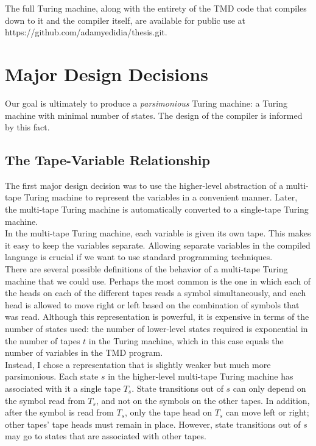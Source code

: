 \documentclass[11pt]{report}
\begin{document}
The full Turing machine, along with the entirety of the TMD code that compiles down to it and the compiler itself, are available for public use at https://github.com/adamyedidia/thesis.git.

\section{Major Design Decisions}

Our goal is ultimately to produce a \emph{parsimonious} Turing machine: a Turing machine with minimal number of states. The design of the compiler is informed by this fact. \\

\subsection{The Tape-Variable Relationship}

The first major design decision was to use the higher-level abstraction of a multi-tape Turing machine to represent the variables in a convenient manner. Later, the multi-tape Turing machine is automatically converted to a single-tape Turing machine.  \\

In the multi-tape Turing machine, each variable is given its own tape. This makes it easy to keep the variables separate. Allowing separate variables in the compiled language is crucial if we want to use standard programming techniques. \\

There are several possible definitions of the behavior of a multi-tape Turing machine that we could use. Perhaps the most common is the one in which each of the heads on each of the different tapes reads a symbol simultaneously, and each head is allowed to move right or left based on the combination of symbols that was read. Although this representation is powerful, it is expensive in terms of the number of states used: the number of lower-level states required is exponential in the number of tapes $t$ in the Turing machine, which in this case equals the number of variables in the TMD program. \\

Instead, I chose a representation that is slightly weaker but much more parsimonious. Each state $s$ in the higher-level multi-tape Turing machine has associated with it a single tape $T_s$. State transitions out of $s$ can only depend on the symbol read from $T_s$, and not on the symbols on the other tapes. In addition, after the symbol is read from $T_s$, only the tape head on $T_s$ can move left or right; other tapes' tape heads must remain in place. However, state transitions out of $s$ may go to states that are associated with other tapes. 
\end{document}
